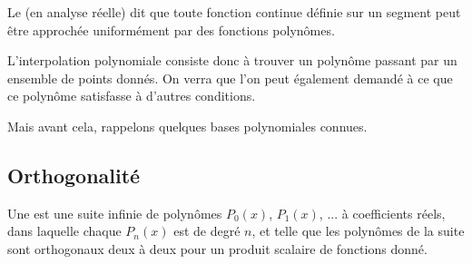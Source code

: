 \medskip
Le  
(en analyse réelle) dit que toute fonction continue définie sur un segment peut être approchée 
uniformément par des fonctions polynômes.


\medskip
L'interpolation polynomiale consiste donc à trouver un polynôme passant par un ensemble de
points donnés. On verra que l'on peut également demandé à ce que ce polynôme
satisfasse à d'autres conditions.

Mais avant cela, rappelons quelques \og bases polynomiales\fg{} connues.%



\medskip
\subsection{Orthogonalité}

Une  est 
une suite infinie de polynômes  $P_0(x)$, $P_1(x)$, ... à coefficients réels, dans laquelle chaque 
$P_n(x)$ est de degré $n$, et telle que les polynômes de la suite sont orthogonaux deux à deux 
pour un produit scalaire de fonctions donné.

